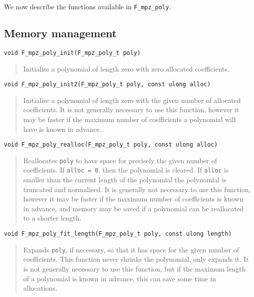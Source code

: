 \documentclass[a4paper,10pt]{article}
\newcommand{\code}{\lstinline}
\begin{document}
We now describe the functions available in \code{F_mpz_poly}.

\subsection{Memory management}

\begin{lstlisting}
void F_mpz_poly_init(F_mpz_poly_t poly)
\end{lstlisting}
\begin{quote}
Initialise a polynomial of length zero with zero allocated coefficients.
\end{quote}

\begin{lstlisting}
void F_mpz_poly_init2(F_mpz_poly_t poly, const ulong alloc)
\end{lstlisting}
\begin{quote}
Initialise a polynomial of length zero with the given number of allocated coefficients. It is not 
generally necessary to use this function, however it may be faster if the maximum number of coefficients
a polynomial will have is known in advance.
\end{quote}

\begin{lstlisting}
void F_mpz_poly_realloc(F_mpz_poly_t poly, const ulong alloc)
\end{lstlisting}
\begin{quote}
Reallocates \code{poly} to have space for precisely the given number of coefficients. If \code{alloc = 0}, 
then the polynomial is cleared. If \code{alloc} is smaller than the current length of the polynomial
the polynomial is truncated and normalised. It is generally not necessary to use this function, however
it may be faster if the maximum number of coefficients is known in advance, and memory may be saved
if a polynomial can be reallocated to a shorter length. 
\end{quote}

\begin{lstlisting}
void F_mpz_poly_fit_length(F_mpz_poly_t poly, const ulong length)
\end{lstlisting}
\begin{quote}
Expands \code{poly}, if necessary, so that it has space for the given number of coefficients. This function
never shrinks the polynomial, only expands it. It is not generally necessary to use this function, but
if the maximum length of a polynomial is known in advance, this can save some time in allocations.
\end{quote}
\end{document}
